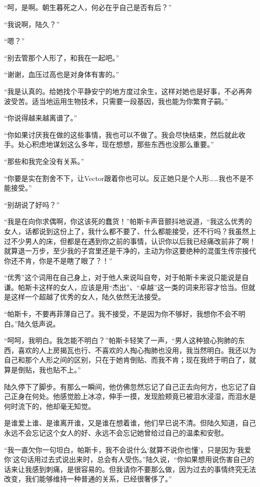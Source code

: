 “呵，是啊。朝生暮死之人，何必在乎自己是否有后？”

“我说啊，陆久？”

“嗯？”

“别去管那个人形了，和我在一起吧。”

“谢谢，血压过高也是对身体有害的。”

“我是认真的。给她找个平静安宁的地方度过余生，这样对她也是好事，不必再奔波受苦。适当地运用生物技术，只需要一段基因，我也能为你繁育子嗣。”

“你说得越来越离谱了。”

“你如果讨厌我在做的这些事情，我也可以不做了。我会尽快结束，然后就此收手。处心积虑地谋划这么多年，现在想想，那些东西也没那么重要。”

“那些和我完全没有关系。”

“你要是实在割舍不下，让Vector跟着你也可以。反正她只是个人形……我也不是不能接受。”

“别胡说了好吗？”

“我是在向你求偶啊，你这该死的蠢货！”帕斯卡声音颤抖地说道，“我这么优秀的女人，话都说到这份上了，我什么都不要了、什么都能接受，还不行吗？我虽然上过不少男人的床，但都是在遇到你之前的事情，认识你以后我已经痛改前非了啊！就算退一万步，至少我的子宫里还是干净的，主动为你这要绝种的混蛋生传宗接代你还不肯，你是不是瞎了眼了？！”

“优秀”这个词用在自己身上，对于他人来说叫自夸，对于帕斯卡来说只能说是自谦。帕斯卡这样的女人，应该是用“杰出”、“卓越”这一类的词来形容才恰当。但就是这样一个超越了优秀的女人，陆久依然无法接受。

“帕斯卡，不要再菲薄自己了。我不接受，不是因为你不够好，我想你不会不明白。”陆久低声说。

“呵呵，我明白。我怎能不明白？”帕斯卡轻笑了一声，“男人这种狼心狗肺的东西，喜欢的人上房揭瓦也行、不喜欢的人掏心掏肺也没用，我当然明白。我还以为自己和那个人形之间的区别，只在于她肯倒贴、而我不肯；现在我终于明白了，就算是倒贴，我也贴不上。”

陆久停下了脚步。有那么一瞬间，他仿佛忽然忘记了自己正去向何方，也忘记了自己正身在何处。他感觉脸上冰凉，伸手一摸，发现脸颊竟已被泪水浸湿，而泪水是何时流下的，他却毫无知觉。

是谁爱上谁、是谁离开谁，又是谁在想着谁，他们早已说不清。但陆久知道，自己永远不会忘记这个女人的好、永远不会忘记她曾给过自己的温柔和安慰。

“我一直欠你一句坦白，帕斯卡，我不会说什么‘就算不说你也懂’，只是因为‘我爱你’这句话用过去式说出来时，总会有人受伤。”陆久说，“你如果想用说伤害自己的话来让我感到刺痛，是很容易的。但我请你不要那么做，因为过去的事情终究无法改变，我们能够维持一种普通的关系，已经很奢侈了。”


